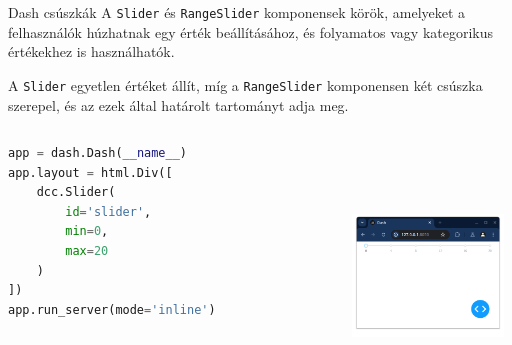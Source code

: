 \documentclass[english, aspectratio=169]{beamer}
\begin{document}
	\begin{frame}[fragile]{Dash csúszkák}
		A \texttt{Slider} és \texttt{RangeSlider} komponensek körök, amelyeket a felhasználók húzhatnak egy érték beállításához, és folyamatos vagy kategorikus értékekhez is használhatók.\par\medskip
		A \texttt{Slider} egyetlen értéket állít, míg a \texttt{RangeSlider} komponensen két csúszka szerepel, és az ezek által határolt tartományt adja meg. 
		\begin{columns}
			\begin{column}{.5\textwidth}
				\begin{lstlisting}[language=python]
app = dash.Dash(__name__)
app.layout = html.Div([
	dcc.Slider(
		id='slider',
		min=0,
		max=20
	)
])
app.run_server(mode='inline')				
				\end{lstlisting}
			\end{column}
			\begin{column}{.5\textwidth}
				\begin{center}
					\includegraphics[width=4cm, height=7cm, keepaspectratio]{images/scatter_16.png}
				\end{center}
			\end{column}
		\end{columns}
	\end{frame}
	
\end{document}
